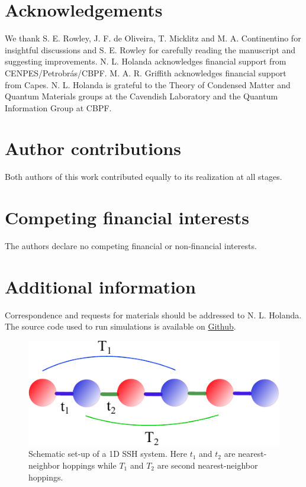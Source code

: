 \documentclass[fleqn,10pt]{wlscirep}
\begin{document}
\section*{Acknowledgements}

We thank S. E. Rowley, J. F. de Oliveira, T. Micklitz and M. A. Continentino for insightful discussions and S. E. Rowley for carefully reading the manuscript and suggesting improvements. N. L. Holanda acknowledges financial support from CENPES/Petrobr\'as/CBPF. M. A. R. Griffith acknowledges financial support from Capes. N. L. Holanda is grateful to the Theory of Condensed Matter and Quantum Materials groups at the Cavendish Laboratory and the Quantum Information Group at CBPF.


\section*{Author contributions}

Both authors of this work contributed equally to its realization at all stages.

\section*{Competing financial interests}

The authors declare no competing financial or non-financial interests.

\section*{Additional information}

Correspondence and requests for materials should be addressed to N. L. Holanda. The source code used to run simulations is available on \href{https://github.com/linneuholanda/ml_topological_phases_in_real_space}{Github}.




\newpage

\begin{figure}
  \centering
  \includegraphics[width=.37\textwidth]{./phase_diagrams/ssh_model.pdf}
  \caption{Schematic set-up of a 1D SSH system. Here $t_1$ and $t_2$ are nearest-neighbor hoppings while $T_1$ and $T_2$ are second nearest-neighbor hoppings.}
\label{fig:model}
\end{figure}
\end{document}

